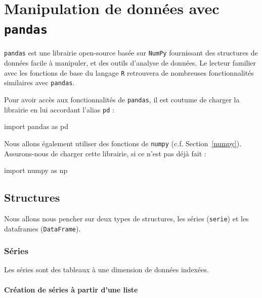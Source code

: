 \documentclass[
  12pt,
]{book}
\newenvironment{Shaded}{\begin{snugshade}}{\end{snugshade}}
\newcommand{\ImportTok}[1]{#1}
\newcommand{\NormalTok}[1]{#1}
\numberwithin{equation}{section}
\numberwithin{countremarque}{section}
\begin{document}
\chapter{\texorpdfstring{Manipulation de données avec \texttt{pandas}}{Manipulation de données avec pandas}}\label{pandas}

\texttt{pandas} est une librairie open-source basée sur \texttt{NumPy} fournissant des structures de données facile à manipuler, et des outils d'analyse de données. Le lecteur familier avec les fonctions de base du langage \texttt{R} retrouvera de nombreuses fonctionnalités similaires avec \texttt{pandas}.

Pour avoir accès aux fonctionnalités de \texttt{pandas}, il est coutume de charger la librairie en lui accordant l'alias \texttt{pd} :

\begin{Shaded}
\begin{Highlighting}[]
\ImportTok{import}\NormalTok{ pandas }\ImportTok{as}\NormalTok{ pd}
\end{Highlighting}
\end{Shaded}

Nous allons également utiliser des fonctions de \texttt{numpy} (c.f. Section~\ref{numpy}). Assurons-nous de charger cette librairie, si ce n'est pas déjà fait :

\begin{Shaded}
\begin{Highlighting}[]
\ImportTok{import}\NormalTok{ numpy }\ImportTok{as}\NormalTok{ np}
\end{Highlighting}
\end{Shaded}

\section{Structures}\label{structures-1}

Nous allons nous pencher sur deux types de structures, les séries (\texttt{serie}) et les dataframes (\texttt{DataFrame}).

\subsection{Séries}\label{suxe9ries}

Les séries sont des tableaux à une dimension de données indexées.

\subsubsection{Création de séries à partir d'une liste}\label{cruxe9ation-de-suxe9ries-uxe0-partir-dune-liste}
\end{document}
